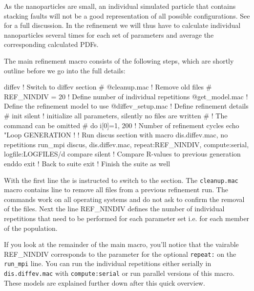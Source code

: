 As the nanoparticles are small, an individual simulated particle that 
contains stacking faults will not be a good representation of all 
possible configurations. See \cite{nedpro} for a full discussion. In the
refinement we will thus have to calculate individual nanoparticles 
several times for each set of parameters and average the corresponding 
calculated PDFs.

The main refinement macro consists of the following steps, which are shortly
outline before we go into the full details:
\begin{MacVerbatim}
diffev                        ! Switch to diffev section
#
  @cleanup.mac                ! Remove old files
#
  REF_NINDIV = 20             ! Define number of individual repetitions
  @get_model.mac              ! Define the refinement model to use
  @diffev_setup.mac           ! Define refinement details
#
  init silent                 ! initialize all parameters, silently no files are written
#                             ! The command can be omitted 
#
  do i[0]=1, 200              ! Number of refinement cycles 
    echo "Loop GENERATION %
    !                         ! Run discus section with macro dis.diffev.mac, no repetitions
    run_mpi discus, dis.diffev.mac, repeat:REF_NINDIV, compute:serial, logfile:LOGFILES/d
    compare silent            ! Compare R-values to previous generation
  enddo
exit                          ! Back to suite
exit                          ! Finish the suite as well
\end{MacVerbatim}
With the first line the \Suite is  instructed to switch to the \Diffev section. 
The {\tt cleanup.mac} macro contains line to remove all files from a previous
refinement run. The commands work on all operating systems and do not ask to
confirm the removal of the files. Next the line REF\_NINDIV  defines the number 
of individual repetitions that need to be performed for each parameter set i.e. 
for each member of the population.

If you look at the remainder of the main macro, you'll notice that 
the vairable REF\_NINDIV 
corresponds to the parameter for the optional {\tt repeat:} on 
the {\tt run\_mpi} line.
You can run the individual repetitions either serially in {\tt dis.diffev.mac}
with {\tt compute:serial} or
run parallel versions of this macro. 
These models are explained 
further down after this quick overview. 

